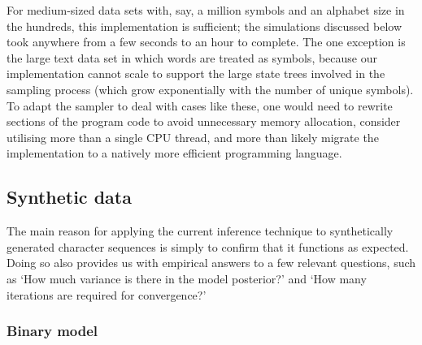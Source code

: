 \documentclass[11pt,a4paper]{article}
\begin{document}
For medium-sized data sets with, say, a million symbols and an alphabet size in
the hundreds, this implementation is sufficient; the simulations discussed below
took anywhere from a few seconds to an hour to complete. The one exception is
the large text data set in which words are treated as symbols, because our
implementation cannot scale to support the large state trees involved in the
sampling process (which grow exponentially with the number of unique symbols).
To adapt the sampler to deal with cases like these, one would need to rewrite
sections of the program code to avoid unnecessary memory allocation, consider
utilising more than a single CPU thread, and more than likely migrate the
implementation to a natively more efficient programming language.

\subsection{Synthetic data}\label{sec:synthetic} %

The main reason for applying the current inference technique to synthetically
generated character sequences is simply to confirm that it functions as
expected. Doing so also provides us with empirical answers to a few relevant
questions, such as `How much variance is there in the model posterior?' and `How
many iterations are required for convergence?'

\subsubsection{Binary model} %
\end{document}
